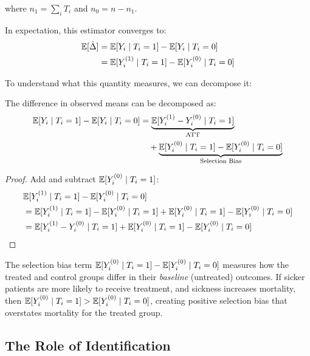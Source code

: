 where $n_1 = \sum_i T_i$ and $n_0 = n - n_1$.

In expectation, this estimator converges to:
\begin{align}
\mathbb{E}[\hat{\Delta}] &= \mathbb{E}[Y_i \mid T_i = 1] - \mathbb{E}[Y_i \mid T_i = 0] \nonumber \\
&= \mathbb{E}[Y^{(1)}_i \mid T_i = 1] - \mathbb{E}[Y^{(0)}_i \mid T_i = 0]
\label{eq:naive_expectation}
\end{align}

To understand what this quantity measures, we can decompose it:

\begin{theorem}
\label{thm:selection_decomposition}
The difference in observed means can be decomposed as:
\begin{align}
\mathbb{E}[Y_i \mid T_i = 1] - \mathbb{E}[Y_i \mid T_i = 0] &= \underbrace{\mathbb{E}[Y^{(1)}_i - Y^{(0)}_i \mid T_i = 1]}_{\text{ATT}} \nonumber \\
&\quad + \underbrace{\mathbb{E}[Y^{(0)}_i \mid T_i = 1] - \mathbb{E}[Y^{(0)}_i \mid T_i = 0]}_{\text{Selection Bias}}
\label{eq:selection_decomposition}
\end{align}
\end{theorem}

\begin{proof}
Add and subtract $\mathbb{E}[Y^{(0)}_i \mid T_i = 1]$:
\begin{align*}
&\mathbb{E}[Y^{(1)}_i \mid T_i = 1] - \mathbb{E}[Y^{(0)}_i \mid T_i = 0] \\
&= \mathbb{E}[Y^{(1)}_i \mid T_i = 1] - \mathbb{E}[Y^{(0)}_i \mid T_i = 1] + \mathbb{E}[Y^{(0)}_i \mid T_i = 1] - \mathbb{E}[Y^{(0)}_i \mid T_i = 0] \\
&= \mathbb{E}[Y^{(1)}_i - Y^{(0)}_i \mid T_i = 1] + \mathbb{E}[Y^{(0)}_i \mid T_i = 1] - \mathbb{E}[Y^{(0)}_i \mid T_i = 0]
\end{align*}
\end{proof}

\begin{insight}
The selection bias term $\mathbb{E}[Y^{(0)}_i \mid T_i = 1] - \mathbb{E}[Y^{(0)}_i \mid T_i = 0]$ measures how the treated and control groups differ in their \emph{baseline} (untreated) outcomes. If sicker patients are more likely to receive treatment, and sickness increases mortality, then $\mathbb{E}[Y^{(0)}_i \mid T_i = 1] > \mathbb{E}[Y^{(0)}_i \mid T_i = 0]$, creating positive selection bias that overstates mortality for the treated group.
\end{insight}

\subsection{The Role of Identification}

